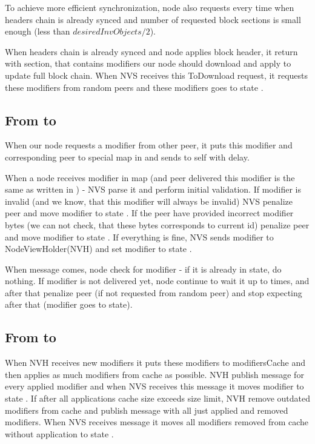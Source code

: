 To achieve more efficient synchronization, node also requests  every time when
headers chain is already synced and number of requested block sections is small enough (less than $desiredInvObjects / 2$).

When headers chain is already synced and node applies block header, it return  with  section,
that contains modifiers our node should download and apply to update full block chain.
When NVS receives this ToDownload request, it requests these modifiers from random peers
and these modifiers goes to state .

\subsection{From  to }

When our node requests a modifier from other peer, it puts this modifier and
corresponding peer to special map  in  and sends  to self
with  delay.

When a node receives modifier in  map
(and peer delivered this modifier is the same as written in ) -
NVS parse it and perform initial validation.
If modifier is invalid (and we know, that this modifier will always be invalid) NVS penalize peer and move modifier to state .
If the peer have provided incorrect modifier bytes (we can not check,
that these bytes corresponds to current id) penalize peer and move modifier to state .
If everything is fine, NVS sends modifier to NodeViewHolder(NVH) and set modifier to state .

When  message comes, node check for modifier - if it is already in  state,
do nothing.
If modifier is not delivered yet, node continue to wait it up to  times, and after that
penalize peer (if not requested from random peer) and stop expecting after that (modifier goes to  state).

\subsection{From  to }

When NVH receives new modifiers it puts these modifiers to modifiersCache and
then applies as much modifiers from cache as possible.
NVH publish  message for every applied modifier and when NVS receives this message it moves modifier to state .
If after all applications cache size exceeds size limit, NVH remove outdated modifiers from cache and publish
 message with all just applied and removed modifiers.
When NVS receives  message it moves all modifiers removed from cache without application to state .